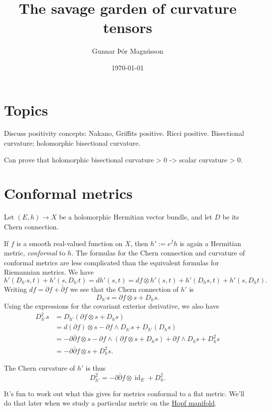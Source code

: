 \documentclass[11pt]{article}
\author{Gunnar Þór Magnússon}
\date{\today}
\title{The savage garden of curvature tensors}
\DeclareMathOperator{\id}{id}
\begin{document}
\maketitle
\tableofcontents


\section{Topics}
\label{sec:org093d592}

Discuss positivity concepts: Nakano, Griffits positive. Ricci positive. Bisectional curvature; holomorphic bisectional curvature.

Can prove that holomorphic bisectional curvature > 0 -> scalar curvature > 0.

\section{Conformal metrics}
\label{sec:org65fcbad}

Let \((E,h) \to X\) be a holomorphic Hermitian vector bundle, and let \(D\) be its Chern connection.

If \(f\) is a smooth real-valued function on \(X\), then \(h' := e^f h\) is again a Hermitian metric, \emph{conformal} to \(h\). The formulas for the Chern connection and curvature of conformal metrics are less complicated than the equivalent formulas for Riemannian metrics. We have
$$
h'(D_{h'} s, t) + h'(s, D_{h'} t)
= d h'(s, t)
= df \otimes h'(s, t) + h'(D_h s, t) + h'(s, D_h t).
$$
Writing \(df = \partial f + \bar\partial f\) we see that the Chern connection of \(h'\) is
$$
D_{h'} s = \partial f \otimes s + D_h s.
$$
Using the expressions for the covariant exterior derivative, we also have
\begin{align*}
D_{h'}^2 s
&= D_{h'}(\partial f \otimes s + D_h s)
\\
&= d(\partial f) \otimes s - \partial f \wedge D_{h'} s + D_{h'}(D_h s)
\\
&= -\partial\bar\partial f \otimes s - \partial f \wedge (\partial f \otimes s + D_h s) + \partial f \wedge D_h s + D_h^2 s
\\
&= -\partial\bar\partial f \otimes s + D_h^2 s.
\end{align*}

The Chern curvature of \(h'\) is thus
$$
D^2_{h'} = -\partial\bar\partial f \otimes \id_E + D^2_h.
$$

It's fun to work out what this gives for metrics conformal to a flat metric. We'll do that later when we study a particular metric on the \hyperref[sec:org8f5818e]{Hopf manifold}.
\end{document}
